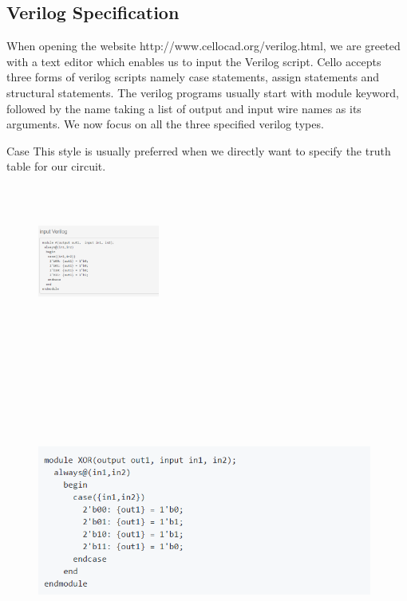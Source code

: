 \documentclass[11pt]{article}
\begin{document}
\subsection*{Verilog Specification}
When opening the website http://www.cellocad.org/verilog.html, we are greeted with a text editor which enables us to input the Verilog script. Cello accepts three forms of verilog scripts namely case statements, assign statements and structural statements. The verilog programs usually start with module keyword, followed by the name taking a list of output and input wire names as its arguments. We now focus on all the three specified verilog types.

Case
This style is usually preferred when we directly want to specify the truth table for our circuit.

\begin{figure}[ht!]
\centering
\includegraphics[width=4cm,height=5cm,keepaspectratio]{Screenshot_1.png}
\includegraphics[width=11cm,height=12cm,keepaspectratio]{Screenshot_2.png}
\label{Case exmaple}
\end{figure}
\end{document}

